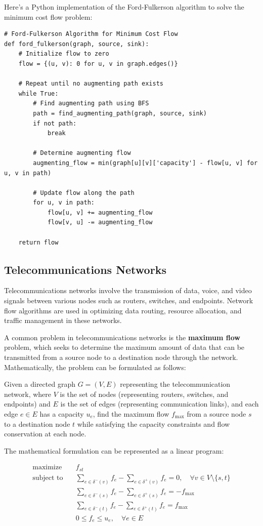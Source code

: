\documentclass[12pt]{book} %
\begin{document}
Here's a Python implementation of the Ford-Fulkerson algorithm to solve the minimum cost flow problem:
\FloatBarrier
\begin{lstlisting}
# Ford-Fulkerson Algorithm for Minimum Cost Flow
def ford_fulkerson(graph, source, sink):
    # Initialize flow to zero
    flow = {(u, v): 0 for u, v in graph.edges()}
    
    # Repeat until no augmenting path exists
    while True:
        # Find augmenting path using BFS
        path = find_augmenting_path(graph, source, sink)
        if not path:
            break
        
        # Determine augmenting flow
        augmenting_flow = min(graph[u][v]['capacity'] - flow[u, v] for u, v in path)
        
        # Update flow along the path
        for u, v in path:
            flow[u, v] += augmenting_flow
            flow[v, u] -= augmenting_flow
    
    return flow
\end{lstlisting}
\FloatBarrier

\subsection{Telecommunications Networks}
Telecommunications networks involve the transmission of data, voice, and video signals between various nodes such as routers, switches, and endpoints. Network flow algorithms are used in optimizing data routing, resource allocation, and traffic management in these networks.


A common problem in telecommunications networks is the \textbf{maximum flow} problem, which seeks to determine the maximum amount of data that can be transmitted from a source node to a destination node through the network. Mathematically, the problem can be formulated as follows:

Given a directed graph \(G = (V, E)\) representing the telecommunication network, where \(V\) is the set of nodes (representing routers, switches, and endpoints) and \(E\) is the set of edges (representing communication links), and each edge \(e \in E\) has a capacity \(u_e\), find the maximum flow \(f_{\text{max}}\) from a source node \(s\) to a destination node \(t\) while satisfying the capacity constraints and flow conservation at each node.

The mathematical formulation can be represented as a linear program:

\[
\begin{aligned}
\text{maximize} \quad & f_{st} \\
\text{subject to} \quad & \sum_{e \in \delta^-(v)} f_e - \sum_{e \in \delta^+(v)} f_e = 0, \quad \forall v \in V \setminus \{s, t\} \\
& \sum_{e \in \delta^-(s)} f_e - \sum_{e \in \delta^+(s)} f_e = -f_{\text{max}} \\
& \sum_{e \in \delta^-(t)} f_e - \sum_{e \in \delta^+(t)} f_e = f_{\text{max}} \\
& 0 \leq f_e \leq u_e, \quad \forall e \in E
\end{aligned}
\]
\end{document}
